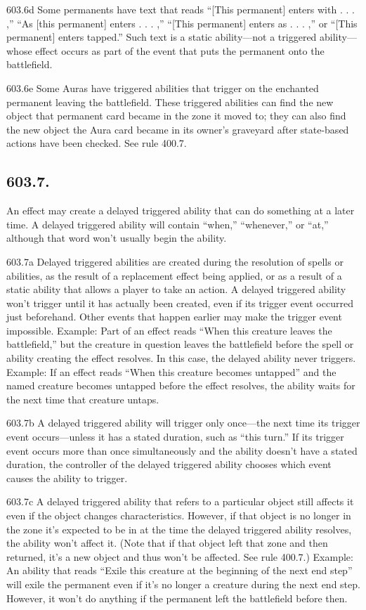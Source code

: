 603.6d Some permanents have text that reads “[This permanent] enters with . . . ,” “As [this permanent] enters . . . ,” “[This permanent] enters as . . . ,” or “[This permanent] enters tapped.” Such text is a static ability—not a triggered ability—whose effect occurs as part of the event that puts the permanent onto the battlefield.

603.6e Some Auras have triggered abilities that trigger on the enchanted permanent leaving the battlefield. These triggered abilities can find the new object that permanent card became in the zone it moved to; they can also find the new object the Aura card became in its owner’s graveyard after state-based actions have been checked. See rule 400.7.

\subsection*{603.7.}
An effect may create a delayed triggered ability that can do something at a later time. A delayed triggered ability will contain “when,” “whenever,” or “at,” although that word won’t usually begin the ability.

603.7a Delayed triggered abilities are created during the resolution of spells or abilities, as the result of a replacement effect being applied, or as a result of a static ability that allows a player to take an action. A delayed triggered ability won’t trigger until it has actually been created, even if its trigger event occurred just beforehand. Other events that happen earlier may make the trigger event impossible.
Example: Part of an effect reads “When this creature leaves the battlefield,” but the creature in question leaves the battlefield before the spell or ability creating the effect resolves. In this case, the delayed ability never triggers.
Example: If an effect reads “When this creature becomes untapped” and the named creature becomes untapped before the effect resolves, the ability waits for the next time that creature untaps.

603.7b A delayed triggered ability will trigger only once—the next time its trigger event occurs—unless it has a stated duration, such as “this turn.” If its trigger event occurs more than once simultaneously and the ability doesn’t have a stated duration, the controller of the delayed triggered ability chooses which event causes the ability to trigger.

603.7c A delayed triggered ability that refers to a particular object still affects it even if the object changes characteristics. However, if that object is no longer in the zone it’s expected to be in at the time the delayed triggered ability resolves, the ability won’t affect it. (Note that if that object left that zone and then returned, it’s a new object and thus won’t be affected. See rule 400.7.)
Example: An ability that reads “Exile this creature at the beginning of the next end step” will exile the permanent even if it’s no longer a creature during the next end step. However, it won’t do anything if the permanent left the battlefield before then.

